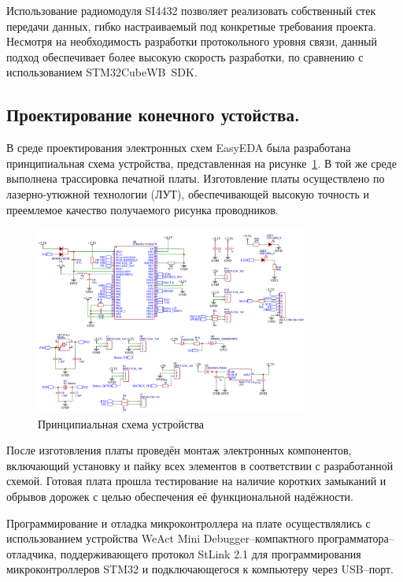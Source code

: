 \documentclass[14pt, a4paper]{extreport}
\begin{document}
Использование радиомодуля SI4432 позволяет реализовать собственный стек передачи данных, гибко настраиваемый под конкретные требования проекта. Несмотря на необходимость разработки
протокольного уровня связи, данный подход обеспечивает более высокую скорость разработки, по сравнению с использованием STM32CubeWB~SDK.

\subsection{Проектирование конечного устойства.}

В среде проектирования электронных схем EasyEDA была разработана принципиальная схема устройства, представленная на рисунке~\ref{fig:STM32_schematic}. В той же среде выполнена
трассировка печатной платы. Изготовление платы осуществлено по лазерно-утюжной технологии (ЛУТ), обеспечивающей высокую точность и преемлемое качество получаемого рисунка проводников.

\begin{figure}[ht]
    \centering
    \includegraphics[width=0.8\textwidth]{images/STM32_schematic.png}
    \caption{Принципиальная схема устройства}
    \label{fig:STM32_schematic}
\end{figure}

После изготовления платы проведён монтаж электронных компонентов, включающий установку и пайку всех элементов в соответствии с разработанной схемой. Готовая плата прошла тестирование
на наличие коротких замыканий и обрывов дорожек с целью обеспечения её функциональной надёжности.

Программирование и отладка микроконтроллера на плате осуществлялись с использованием устройства WeAct Mini Debugger--компактного программатора--отладчика, поддерживающего протокол
StLink 2.1 для программирования микроконтроллеров STM32 и подключающегося к компьютеру через USB--порт.
\end{document}
